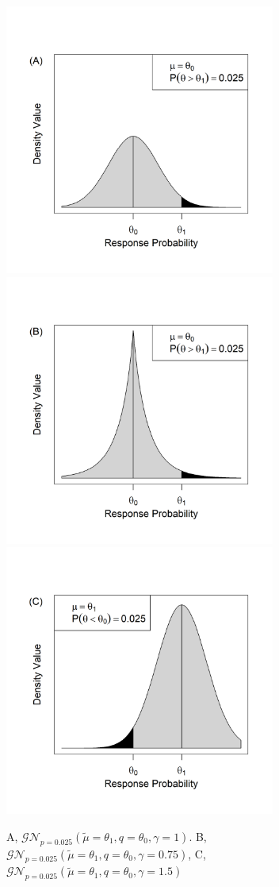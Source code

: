 \documentclass[12pt]{article}
\begin{document}
\begin{figure}\begin{center}
\includegraphics[width=3.5in]{./FIGURES/figure1a.png}
\includegraphics[width=3.5in]{./FIGURES/figure1b.png}
\includegraphics[width=3.5in]{./FIGURES/figure1c.png}

\caption{A, $\mathcal{GN}_{p=0.025}(\tilde{\mu}=\theta_1,q=\theta_0,\gamma=1)$. B, $\mathcal{GN}_{p=0.025}(\tilde{\mu}=\theta_1,q=\theta_0,\gamma=0.75)$, C, $\mathcal{GN}_{p=0.025}(\tilde{\mu}=\theta_1,q=\theta_0,\gamma=1.5)$}
\label{fig:figure1}
\end{center}\end{figure}
\end{document}
